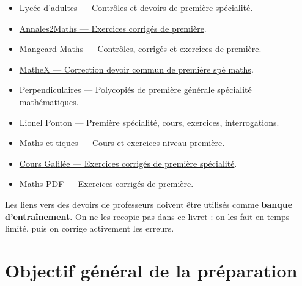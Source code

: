 \documentclass[11pt,a4paper]{article}
\begin{document}
\begin{sujetprof}
\begin{itemize}
  \item \href{https://www.lyceedadultes.fr/sitepedagogique/pages/math1Spe_controlesdevoirs.html}{Lycée d'adultes — Contrôles et devoirs de première spécialité}.
  \item \href{https://www.annales2maths.com/exercices-corriges-1s/}{Annales2Maths — Exercices corrigés de première}.
  \item \href{https://mangeard.maths.free.fr/premiereS.htm}{Mangeard Maths — Contrôles, corrigés et exercices de première}.
  \item \href{https://mathexien.com/Maths1ere/assets/pdf/ds_commun_2022_1_correction.pdf}{MatheX — Correction devoir commun de première spé maths}.
  \item \href{https://perpendiculaires.free.fr/?page_id=2554}{Perpendiculaires — Polycopiés de première générale spécialité mathématiques}.
  \item \href{https://lionelponton.fr/Premi%C3%A8re-sp%C3%A9cialit%C3%A9/}{Lionel Ponton — Première spécialité, cours, exercices, interrogations}.
  \item \href{https://www.maths-et-tiques.fr/index.php/cours-maths/niveau-premiere}{Maths et tiques — Cours et exercices niveau première}.
  \item \href{https://cours-galilee.com/ressources-2/specialite-maths-premiere/exercices-maths-premiere/}{Cours Galilée — Exercices corrigés de première spécialité}.
  \item \href{https://maths-pdf.fr/exercices-maths-1ere}{Maths-PDF — Exercices corrigés de première}.
\end{itemize}
\end{sujetprof}

\begin{alerte}
Les liens vers des devoirs de professeurs doivent être utilisés comme \textbf{banque d'entraînement}.  
On ne les recopie pas dans ce livret : on les fait en temps limité, puis on corrige activement les erreurs.
\end{alerte}

\section{Objectif général de la préparation}
\end{document}
